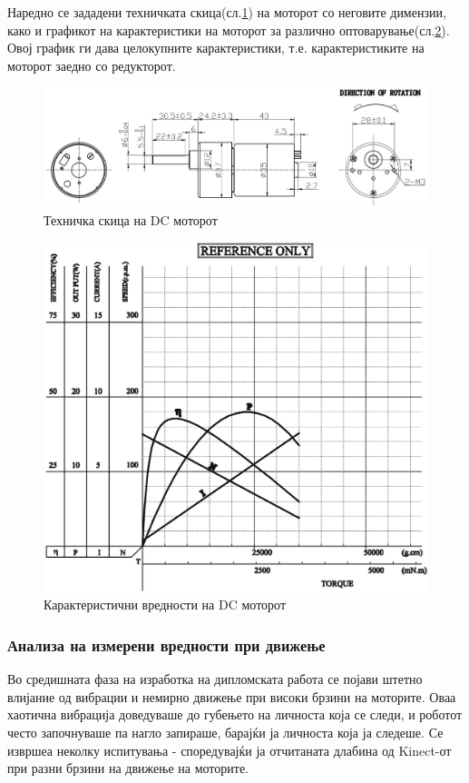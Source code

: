 \documentclass[11pt]{article}
\begin{document}
		  Наредно се зададени техничката скица(сл.\ref{fig:motor_schematic}) на моторот со неговите димензии, како и графикот на карактеристики на моторот за различно оптоварување(сл.\ref{fig:motor_graph}). Овој график ги дава целокупните карактеристики, т.е. карактеристиките на моторот заедно со редукторот.

      \begin{figure}[H]
        \includegraphics[width=0.75\linewidth]{./images/motor_schematic.png}
		    \centering
        \caption{Техничка скица на DC моторот}
		    \label{fig:motor_schematic}
		    \end{figure}

	    \begin{figure}[H]
		    \includegraphics[width=0.75\linewidth]{./images/motor_graph.png}
		    \centering
		    \caption{Карактеристични вредности на DC моторот}
		    \label{fig:motor_graph}
	      \end{figure}

      \subsubsection{Анализа на измерени вредности при движење} \label{sec:composites}
      Во средишната фаза на изработка на дипломската работа се појави штетно влијание од вибрации и немирно движење при високи брзини на моторите. Оваа хаотична вибрација доведуваше до губењето на личноста која се следи, и роботот често започнуваше па нагло запираше, барајќи ја личноста која ја следеше. Се извршеа неколку испитувања - споредувајќи ја отчитаната длабина од Kinect-от при разни брзини на движење на моторите.
\end{document}
